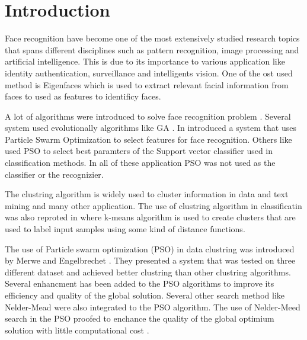 \documentclass[a4paper,twoside]{article}
\begin{document}


%
\section{Introduction}

Face recognition have become one of the most extensively studied research topics that spans different disciplines such as pattern recognition, image processing and artificial intelligence. This is due to its importance to various application like identity authentication, surveillance and intelligents vision. One of the ost used method is Eigenfaces which is used to extract relevant facial information from faces to used as features to identificy faces\cite{Turk91}.

A lot of algorithms were introduced to solve face recognition problem \cite{apperance2003,survey2003}. Several system used evolutionally algorithms like GA \cite{ga2004}.  In \cite {Ramadan2009} introduced a system that uses Particle Swarm Optimization to select features for face recognition.  Others like \cite{Wei20114390} used PSO to select best paramters of the Support vector classifier used in classification methods. In all of these application PSO was not used as the classifier or the recognizier. %

The clustring algorithm is widely used to cluster information in data and text mining and many other application. The use of clustring algorithm in classificatin was also reproted in \cite{Bagirov03unsupervisedand} where k-means algorithm is used to create clusters that are used to label input samples using some kind of distance functions. %

The use of Particle swarm optimization (PSO) in data clustring was introduced by Merwe and Engelbrechet \cite{psoclustering,Cheo2004}. They presented a system that was tested on three different dataset and achieved better clustring than other clustring algorithms. Several enhancment has been added to the PSO algorithms to improve its efficiency and quality of the global solution. Several other search method like Nelder-Mead \cite{neldermead}  were also  integrated to the PSO algorithm. The use of Nelder-Meed search in the PSO proofed to enchance the quality of the global optimium solution with little computational cost \cite{nelderMeadPSO}.
\end{document}
